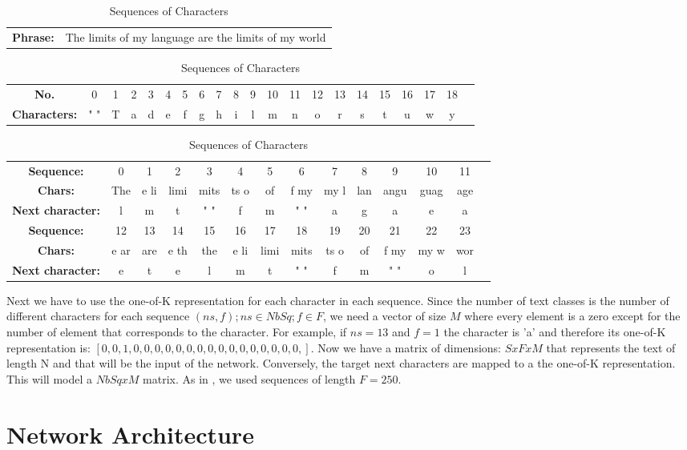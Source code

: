 \begin{table}{}

\begin{tabular}{c c}
\textbf{Phrase: }&The limits of my language are the limits of my world \\
\end{tabular}
\begin{tabular}{c c c c c c c c c c c c c c c c c c c c c}
\textbf{No.}&0&1&2&3&4&5&6&7&8&9&10&11&12&13&14&15&16&17&18\\
\textbf{Characters:}& " "& T& a& d& e& f& g& h& i& l& m& n& o& r& s& t& u& w& y\\
\end{tabular}

\begin{tabular}{c c c c c c c c c c c c c c}
\textbf{Sequence:} &0&1&2 & 3 &4&5&6&7&8&9&10&11\\
\textbf{Chars:} &The &e li&limi&mits&ts o& of &f my&my l& lan&angu&guag&age\\ 
\textbf{Next character: }&l&m&t&" "&f&m&" "&a&g&a&e&a\\
\textbf{Sequence:} &12&13&14&15&16&17&18&19&20&21&22&23\\
\textbf{Chars:} &e ar&are &e th&the &e li&limi&mits&ts o& of &f my&my w& wor\\
\textbf{Next character: }&e&t&e&l&m&t&" "&f&m&" "&o&l\\
\end{tabular}

\caption{Sequences of Characters}
\label{tab:seqch}

\end{table}


Next we have to use the one-of-K representation for each character in each sequence. Since the number of text classes is the number of different characters for each sequence $(ns,f);  ns \in NbSq; f \in F $, we need a vector of size $M$ where every element is a zero except for the number of element that corresponds to the character. For example, if $ns=13$ and $f=1$ the character is 'a' and therefore its one-of-K representation is: $[0,0,1,0,0,0,0,0,0,0,0,0,0,0,0,0,0,0,0,]$. 
Now we have a matrix of dimensions: $SxFxM$ that represents the text of length N and that will be the input of the network. Conversely, the target next characters are mapped to a the one-of-K representation. This will model a $NbSq x M$ matrix. As in \cite{sutskever2011generating}, we used sequences of length $F=250$. 

\section{Network Architecture}

